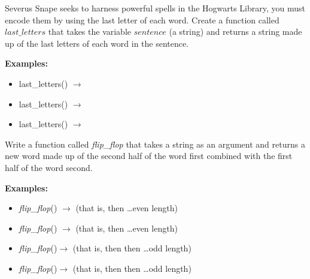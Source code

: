 	\item 
		Severus Snape seeks to harness powerful spells in the Hogwarts Library, you must 
		encode them by using the last letter of each word. Create a function called 
		$last\_letters$ that takes the variable $sentence$ (a string) and returns
		a string made up of the last letters of each word in the sentence. 

		\textbf{Examples:}
		\begin{itemize}
			\item last\_letters() 
				$\rightarrow$ 
			\item last\_letters() $\rightarrow$ 
			\item last\_letters() $\rightarrow$ 
		\end{itemize}



	\item
		Write a function called \textit{flip\_flop} that takes a string as an argument 
		and returns  a new word made up of the second half of the word first combined 
		with the first half of the word second.

		\textbf{Examples:}
		\begin{itemize}
			\item \textit{flip\_flop}() $\rightarrow$  
				(that is,  then  \dots even length)
			\item \textit{flip\_flop}() $\rightarrow$  
				(that is,  then  \dots even length)
			\item \textit{flip\_flop}()$\rightarrow$ 
				(that is,  then  then  \dots odd length)
			\item \textit{flip\_flop}()$\rightarrow$ 
				(that is,  then  then  \dots odd length)

		\end{itemize}


